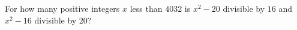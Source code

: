 For how many positive integers $x$ less than $4032$ is $x^2-20$ divisible by $16$ and $x^2-16$ divisible by $20$?
